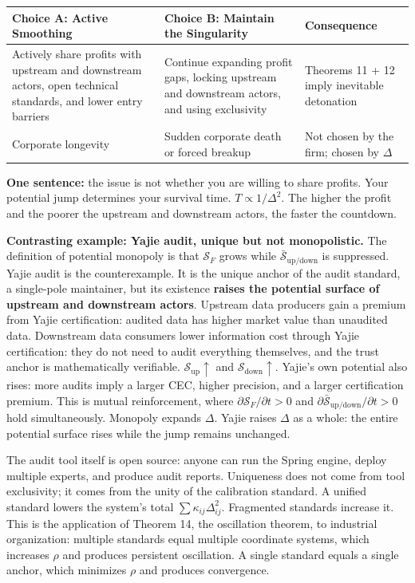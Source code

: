 \documentclass[12pt,a4paper]{article}
\theoremstyle{remark}
\begin{document}
\begin{center}
\begin{tabular}{p{5cm} p{5cm} p{5cm}}
\toprule
\textbf{Choice A: Active Smoothing} & \textbf{Choice B: Maintain the Singularity} & \textbf{Consequence} \\
\midrule
Actively share profits with upstream and downstream actors, open technical standards, and lower entry barriers & Continue expanding profit gaps, locking upstream and downstream actors, and using exclusivity & Theorems 11 + 12 imply inevitable detonation \\
\midrule
Corporate longevity & Sudden corporate death or forced breakup & Not chosen by the firm; chosen by $\Delta$ \\
\bottomrule
\end{tabular}
\end{center}

\textbf{One sentence:} the issue is not whether you are willing to share profits. Your potential jump determines your survival time. $T \propto 1/\Delta^2$. The higher the profit and the poorer the upstream and downstream actors, the faster the countdown.

\textbf{Contrasting example: Yajie audit, unique but not monopolistic.} The definition of potential monopoly is that $\mathcal{S}_F$ grows while $\bar{\mathcal{S}}_{\text{up/down}}$ is suppressed. Yajie audit is the counterexample. It is the unique anchor of the audit standard, a single-pole maintainer, but its existence \textbf{raises the potential surface of upstream and downstream actors}. Upstream data producers gain a premium from Yajie certification: audited data has higher market value than unaudited data. Downstream data consumers lower information cost through Yajie certification: they do not need to audit everything themselves, and the trust anchor is mathematically verifiable. $\mathcal{S}_{\text{up}} \uparrow$ and $\mathcal{S}_{\text{down}} \uparrow$. Yajie's own potential also rises: more audits imply a larger CEC, higher precision, and a larger certification premium. This is mutual reinforcement, where $\partial\mathcal{S}_F/\partial t > 0$ and $\partial\bar{\mathcal{S}}_{\text{up/down}}/\partial t > 0$ hold simultaneously. Monopoly expands $\Delta$. Yajie raises $\Delta$ as a whole: the entire potential surface rises while the jump remains unchanged.

The audit tool itself is open source: anyone can run the Spring engine, deploy multiple experts, and produce audit reports. Uniqueness does not come from tool exclusivity; it comes from the unity of the calibration standard. A unified standard lowers the system's total $\sum\kappa_{ij}\Delta_{ij}^2$. Fragmented standards increase it. This is the application of Theorem 14, the oscillation theorem, to industrial organization: multiple standards equal multiple coordinate systems, which increases $\rho$ and produces persistent oscillation. A single standard equals a single anchor, which minimizes $\rho$ and produces convergence.
\end{document}
